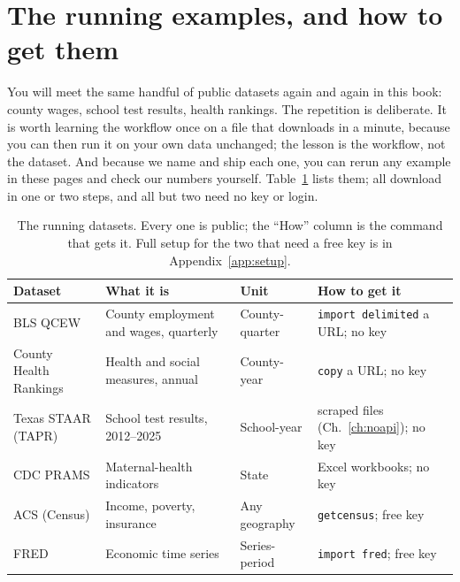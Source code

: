 \documentclass[
    a4paper,
    fontsize=10pt,
    twoside=true,
    numbers=noenddot,
]{kaobook}
\begin{document}
\section{The running examples, and how to get them}
You will meet the same handful of public datasets again and again in this book: county wages, school test results, health rankings. The repetition is deliberate. It is worth learning the workflow once on a file that downloads in a minute, because you can then run it on your own data unchanged; the lesson is the workflow, not the dataset. And because we name and ship each one, you can rerun any example in these pages and check our numbers yourself. Table~\ref{tab:data} lists them; all download in one or two steps, and all but two need no key or login.

\begin{table}[htbp]
\centering
\footnotesize
\caption[The book's running datasets]{The running datasets. Every one is public; the ``How'' column is the command that gets it. Full setup for the two that need a free key is in Appendix~\ref{app:setup}.}
\label{tab:data}
\begin{tabular}{@{}p{2.5cm}p{3.4cm}p{2.1cm}p{3.0cm}@{}}
\hline
\textbf{Dataset} & \textbf{What it is} & \textbf{Unit} & \textbf{How to get it} \\
\hline
BLS QCEW & County employment and wages, quarterly & County-quarter & \texttt{import delimited} a URL; no key \\
County Health Rankings & Health and social measures, annual & County-year & \texttt{copy} a URL; no key \\
Texas STAAR (TAPR) & School test results, 2012--2025 & School-year & scraped files (Ch.~\ref{ch:noapi}); no key \\
CDC PRAMS & Maternal-health indicators & State & Excel workbooks; no key \\
ACS (Census) & Income, poverty, insurance & Any geography & \texttt{getcensus}; free key \\
FRED & Economic time series & Series-period & \texttt{import fred}; free key \\
\hline
\end{tabular}
\end{table}
\end{document}
